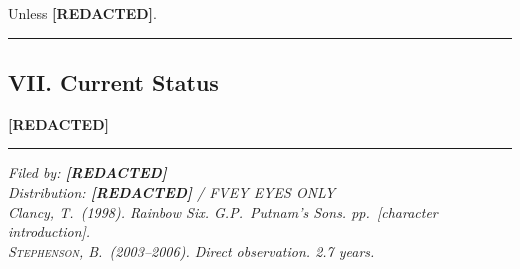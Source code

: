 Unless \textbf{[REDACTED]}.

\vspace{1cm}\hrule\vspace{1cm}

\subsection*{VII. Current Status}
\label{interlude:current-status}

\textbf{[REDACTED]}

\vspace{1cm}\hrule\vspace{0.5cm}

\begin{flushright}\small\textit{%
Filed by: \textbf{[REDACTED]}\\
Distribution: \textbf{[REDACTED]} / FVEY EYES ONLY\\[0.5em]
Clancy, T.\ (1998). Rainbow Six. G.P.\ Putnam's Sons. pp.\ [character introduction].\\
\textsc{Stephenson}, B.\ (2003--2006). Direct observation. 2.7 years.%
}\end{flushright}

\chapterreturn
